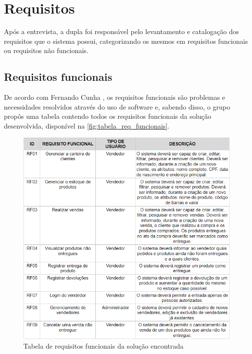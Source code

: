 \documentclass[serif, english, brazilian, oneside]{uffstex}
\begin{document}
\chapter{Requisitos}

Após a entrevista, a dupla foi responsável pelo levantamento e catalogação dos requisitos que o sistema possui, categorizando os mesmos em requisitos funcionais ou requisitos não funcionais.

\section{Requisitos funcionais}

De acordo com Fernando Cunha \cite{requisitos-o-que-sao}, os requisitos funcionais são problemas e necessidades resolvidos através do uso de software e, sabendo disso, o grupo propôs uma tabela contendo todos os requisitos funcionais da solução desenvolvida, disponível na \autoref{fig:tabela_req_funcionais}.
\begin{figure}[!htpb]
    \centering
    \caption{Tabela de requisitos funcionais da solução encontrada}
    \label{fig:tabela_req_funcionais}
    \includegraphics[width=\linewidth]{imagens/tabela_req_funcionais.png}
\end{figure}

\printbibliography[heading=abnt]
\end{document}
